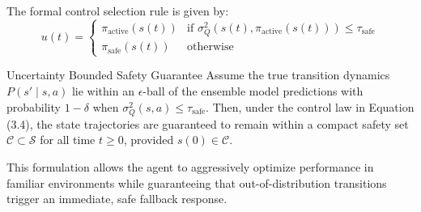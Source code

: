 The formal control selection rule is given by:
\begin{equation}
    u(t) = \begin{cases}
        \pi_{\text{active}}(s(t)) & \text{if } \sigma^2_Q(s(t), \pi_{\text{active}}(s(t))) \leq \tau_{\text{safe}} \\
        \pi_{\text{safe}}(s(t)) & \text{otherwise}
    \end{cases}
\end{equation}

\begin{theorembox}{Uncertainty Bounded Safety Guarantee}
    Assume the true transition dynamics $P(s' \mid s, a)$ lie within an $\epsilon$-ball of the ensemble model predictions with probability $1 - \delta$ when $\sigma^2_Q(s, a) \leq \tau_{\text{safe}}$. Then, under the control law in Equation (3.4), the state trajectories are guaranteed to remain within a compact safety set $\mathcal{C} \subset \mathcal{S}$ for all time $t \geq 0$, provided $s(0) \in \mathcal{C}$.
\end{theorembox}

This formulation allows the agent to aggressively optimize performance in familiar environments while guaranteeing that out-of-distribution transitions trigger an immediate, safe fallback response.

